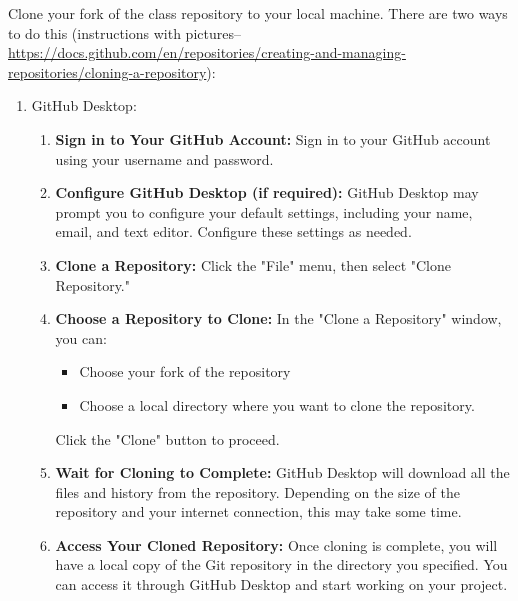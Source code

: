 \documentclass[12pt,english]{exam}
\begin{document}
\begin{questions}
\question Clone your fork of the class repository to your local machine. There are two ways to do this (instructions with pictures--\url{https://docs.github.com/en/repositories/creating-and-managing-repositories/cloning-a-repository}):
\begin{enumerate}
  \item GitHub Desktop: 
  \begin{enumerate}
    \item \textbf{Sign in to Your GitHub Account:}
        Sign in to your GitHub account using your username and password.
    \item \textbf{Configure GitHub Desktop (if required):}
        GitHub Desktop may prompt you to configure your default settings, including your name, email, and text editor. Configure these settings as needed.
    \item \textbf{Clone a Repository:}
        Click the "File" menu, then select "Clone Repository."
    \item \textbf{Choose a Repository to Clone:}
        In the "Clone a Repository" window, you can:
        \begin{itemize}
          \item Choose your fork of the repository
          \item Choose a local directory where you want to clone the repository.
        \end{itemize}
        Click the "Clone" button to proceed.
    \item \textbf{Wait for Cloning to Complete:}
        GitHub Desktop will download all the files and history from the repository. Depending on the size of the repository and your internet connection, this may take some time.
    
    \item \textbf{Access Your Cloned Repository:}
        Once cloning is complete, you will have a local copy of the Git repository in the directory you specified. You can access it through GitHub Desktop and start working on your project.
  \end{enumerate}
  

\end{enumerate}
\end{questions}
\end{document}
